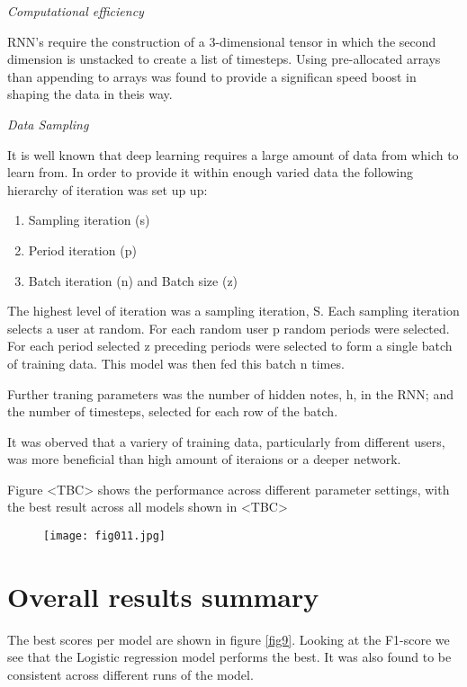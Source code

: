\textit{Computational efficiency}

RNN's require the construction of a 3-dimensional tensor in which the second dimension is unstacked to create a list of timesteps. Using pre-allocated arrays than appending to arrays was found to provide a significan speed boost in shaping the data in theis way.

\textit{Data Sampling}

It is well known that deep learning requires a large amount of data from which to learn from. In order to provide it within enough varied data the following hierarchy of iteration was set up up:

\begin{enumerate}
	\item Sampling iteration (s)
	\item Period iteration (p)
	\item Batch iteration (n) and Batch size (z)
\end{enumerate}

The highest level of iteration was a sampling iteration, S. Each sampling iteration selects a user at random.  For each random user p random periods were selected. For each period selected z preceding periods were selected to form a single batch of training data. This model was then fed this batch n times.

Further traning parameters was the number of hidden notes, h, in the RNN; and the number of timesteps, selected for each row of the batch.

It was oberved that a variery of training data, particularly from different users, was more beneficial than  high amount of iteraions or a deeper network.

Figure <TBC> shows the performance across different parameter settings, with the best result across all models shown in <TBC>

\begin{figure}[h!]
	\centering
	\texttt{[image: fig011.jpg]}
	\caption{}
	\label{fig:fig11}
\end{figure} 


\section{Overall results summary}

The best scores per model are shown in figure \ref{fig9}.
Looking at the F1-score we see that the Logistic regression model performs the best. It was also found to be consistent across different runs of the model.


